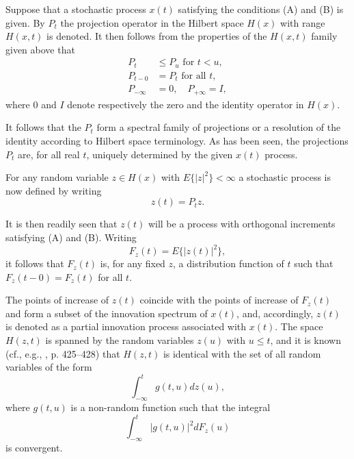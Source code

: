 \documentclass[11pt]{article}
\begin{document}
Suppose that a stochastic process $x(t)$ satisfying the conditions (A) and (B) is given. By $P_t$ the projection operator in the Hilbert space $H(x)$ with range $H(x, t)$ is denoted. It then follows from the properties of the $H(x, t)$ family given above that
\begin{align}
P_t &\leq P_u \text{ for } t < u, \label{eq:proj_monotone}\\
P_{t-0} &= P_t \text{ for all } t, \label{eq:proj_left_cont}\\
P_{-\infty} &= 0, \quad P_{+\infty} = I, \label{eq:proj_limits}
\end{align}
where $0$ and $I$ denote respectively the zero and the identity operator in $H(x)$.

It follows that the $P_t$ form a spectral family of projections or a resolution of the identity according to Hilbert space terminology. As has been seen, the projections $P_t$ are, for all real $t$, uniquely determined by the given $x(t)$ process.

For any random variable $z \in H(x)$ with $E\{|z|^2\} < \infty$ a stochastic process is now defined by writing
\begin{equation}
z(t) = P_t z.
\label{eq:partial_innovation}
\end{equation}

It is then readily seen that $z(t)$ will be a process with orthogonal increments satisfying (A) and (B). Writing
\begin{equation}
F_z(t) = E\{|z(t)|^2\},
\label{eq:distribution_function}
\end{equation}
it follows that $F_z(t)$ is, for any fixed $z$, a distribution function of $t$ such that $F_z(t - 0) = F_z(t)$ for all $t$.

The points of increase of $z(t)$ coincide with the points of increase of $F_z(t)$ and form a subset of the innovation spectrum of $x(t)$, and, accordingly, $z(t)$ is denoted as a partial innovation process associated with $x(t)$. The space $H(z, t)$ is spanned by the random variables $z(u)$ with $u \leq t$, and it is known (cf., e.g., \cite{doob1953}, p. 425--428) that $H(z, t)$ is identical with the set of all random variables of the form
\begin{equation}
\int_{-\infty}^t g(t, u) dz(u),
\label{eq:stochastic_integral}
\end{equation}
where $g(t, u)$ is a non-random function such that the integral
\begin{equation}
\int_{-\infty}^t |g(t, u)|^2 dF_z(u)
\label{eq:integral_convergence}
\end{equation}
is convergent.
\end{document}
